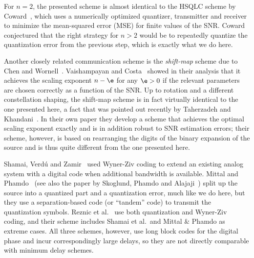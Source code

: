 For $n=2$, the presented scheme is almost identical to the HSQLC scheme by
Coward~\cite{Coward2001}, which uses a numerically optimized quantizer,
transmitter and receiver to minimize the mean-squared error (MSE) for finite
values of the SNR. Coward conjectured that the right strategy for $n > 2$ would
be to repeatedly quantize the quantization error from the previous step, which
is exactly what we do here.

Another closely related communication scheme is the \emph{shift-map} scheme due
to Chen and Wornell~\cite{ChenW1998}.  Vaishampayan and
Costa~\cite{VaishampayanC2003} showed in their analysis that it achieves the
scaling exponent $n-\e$ for any $\e > 0$ if the relevant parameters are chosen
correctly as a function of the SNR. Up to rotation and a different constellation
shaping, the shift-map scheme is in fact virtually identical to the one
presented here, a fact that was pointed out recently by Taherzadeh and
Khandani~\cite{TaherzadehK2008}. In their own paper they develop a scheme that
achieves the optimal scaling exponent exactly and is in addition robust to SNR
estimation errors; their scheme, however, is based on rearranging the digits of
the binary expansion of the source and is thus quite different from the one
presented here.

Shamai, Verd\'u and Zamir~\cite{ShamaiVZ1998} used Wyner-Ziv coding to extend an
existing analog system with a digital code when additional bandwidth is
available. Mittal and Phamdo~\cite{MittalP2002} (see also the paper by Skoglund,
Phamdo and Alajaji~\cite{SkoglundPA2002}) split up the source into a quantized
part and a quantization error, much like we do here, but they use a
separation-based code (or ``tandem'' code) to transmit the quantization symbols.
Reznic et al.~\cite{ReznicFZ2006} use both quantization and Wyner-Ziv coding,
and their scheme includes Shamai et al.\ and Mittal \& Phamdo as extreme cases.
All three schemes, however, use long block codes for the digital phase and incur
correspondingly large delays, so they are not directly comparable with minimum
delay schemes.










